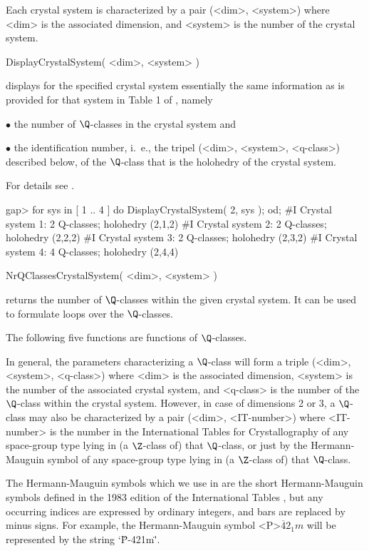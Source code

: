 Each crystal system is characterized by a pair (<dim>, <system>) where
<dim>  is the associated dimension,  and  <system> is  the number of  the
crystal system.

\>DisplayCrystalSystem( <dim>, <system> )

displays for the specified crystal system essentially the same
information as is provided for that system in Table 1 of
\cite{BBNWZ78}, namely

\beginlist%
\item{$\bullet$} 
    the number of $\Q$-classes in the crystal system and
\item{$\bullet$} 
    the identification number, i.~e., the tripel (<dim>, <system>,
    <q-class>) described below, of the $\Q$-class that is the 
    holohedry of the crystal system.  
\endlist

For details see \cite{BBNWZ78}.

\beginexample
gap> for sys in [ 1 .. 4 ] do  DisplayCrystalSystem( 2, sys );  od;
#I  Crystal system 1: 2 Q-classes; holohedry (2,1,2)
#I  Crystal system 2: 2 Q-classes; holohedry (2,2,2)
#I  Crystal system 3: 2 Q-classes; holohedry (2,3,2)
#I  Crystal system 4: 4 Q-classes; holohedry (2,4,4)
\endexample


\>NrQClassesCrystalSystem( <dim>, <system> )

returns the number of $\Q$-classes within the given crystal system.
It can be used to formulate loops over the $\Q$-classes.

The following five functions are functions of $\Q$-classes.

In general, the parameters characterizing a $\Q$-class will form a
triple (<dim>, <system>, <q-class>) where <dim> is the associated
dimension, <system> is the number of the associated crystal system,
and <q-class> is the number of the $\Q$-class within the crystal
system.  However, in case of dimensions 2 or 3, a $\Q$-class may also
be characterized by a pair (<dim>, <IT-number>) where <IT-number> is
the number in the International Tables for Crystallography
\cite{Hah95} of any space-group type lying in (a $\Z$-class of) that
$\Q$-class, or just by the Hermann-Mauguin symbol of any space-group
type lying in (a $\Z$-class of) that $\Q$-class.

The Hermann-Mauguin symbols  which we
use in {\GAP} are the short Hermann-Mauguin symbols defined in the
1983 edition of the International Tables \cite{Hah95}, but any
occurring indices are expressed by ordinary integers, and bars are
replaced by minus signs.  For example, the Hermann-Mauguin symbol
<P>$\overline{4}2_1m$ will be represented by the string `\"P-421m\"'.

